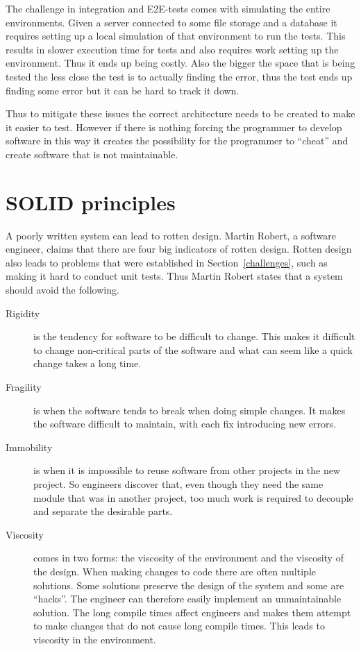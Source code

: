 The challenge in integration and E2E-tests comes with simulating the entire
environments. Given a server connected to some file storage and a database it
requires setting up a local simulation of that environment to run the tests.
This results in slower execution time for tests and also requires work setting
up the environment. Thus it ends up being costly. Also the bigger the space
that is being tested the less close the test is to actually finding the error,
thus the test ends up finding some error but it can be hard to track it down.

Thus to mitigate these issues the correct architecture needs to be created to
make it easier to test. However if there is nothing forcing the programmer to
develop software in this way it creates the possibility for the programmer to
``cheat'' and create software that is not maintainable. 

\section{SOLID principles}\label{oop}

A poorly written system can lead to rotten design. Martin Robert, a software
engineer, claims that there are four big indicators of rotten design. Rotten
design also leads to problems that were established in
Section~\ref{challenges}, such as making it hard to conduct unit tests. Thus
Martin Robert states that a system should avoid the following.

\begin{description}

\item[ Rigidity ] is the tendency for software to be difficult to
change. This makes it difficult to change non-critical parts of the software and
what can seem like a quick change takes a long time.

\item[ Fragility ] is when the software tends to break when doing
simple changes. It makes the software difficult to maintain, with each fix
introducing new errors.

\item[ Immobility ] is when it is impossible to reuse software from
other projects in the new project. So engineers discover that, even though they
need the same module that was in another project, too much work is required to
decouple and separate the desirable parts.

\item[ Viscosity ] comes in two forms: the viscosity of the environment and the
    viscosity of the design. When making changes to code there are often
        multiple solutions. Some solutions preserve the design of the system and
        some are ``hacks''. The engineer can therefore easily implement an
        unmaintainable solution. The long compile times affect engineers and
        makes them attempt to make changes that do not cause long compile times.
        This leads to viscosity in the environment.

\end{description}

